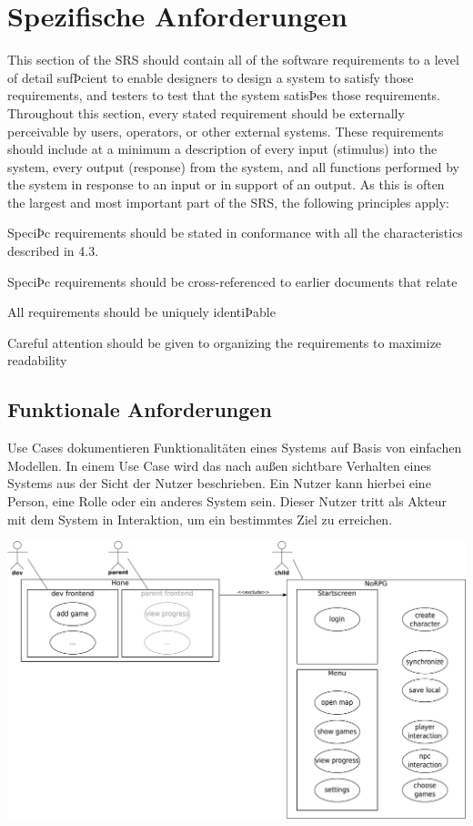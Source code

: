 \section{Spezifische Anforderungen}
	This section of the SRS should contain all of the software requirements to a level of detail sufÞcient to enable designers to design a system to satisfy those requirements, and testers to test that the system satisÞes those requirements. Throughout this section, every stated requirement should be externally perceivable by users, operators, or other external systems. These requirements should include at a minimum a description of
every input (stimulus) into the system, every output (response) from the system, and all functions performed by the system in response to an input or in support of an output. As this is often the largest and most important part of the SRS, the following principles apply:

	SpeciÞc requirements should be stated in conformance with all the characteristics described in 4.3.
	
	SpeciÞc requirements should be cross-referenced to earlier documents that relate
	
	All requirements should be uniquely identiÞable
	
	Careful attention should be given to organizing the requirements to maximize readability

	\subsection{Funktionale Anforderungen}
		Use Cases dokumentieren Funktionalitäten eines Systems auf Basis von einfachen Modellen. In einem Use Case wird das nach außen sichtbare Verhalten eines Systems aus der Sicht der Nutzer beschrieben. Ein Nutzer kann hierbei eine Person, eine Rolle oder ein anderes System sein. Dieser Nutzer tritt als Akteur mit dem System in Interaktion, um ein bestimmtes Ziel zu erreichen.
	
		\begin{center}
			\includegraphics[width=\textwidth]{pics/OUCD.pdf}
		\end{center}
	
